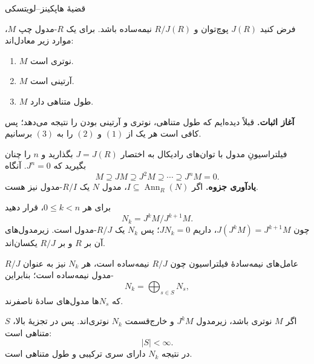 \begin{frame}[t]{قضیهٔ هاپکینز--لویتسکی}
\label{lec15:hopkins-levitzki}
\begin{theorem}
فرض کنید \(J(R)\) پوچ‌توان و \(R/J(R)\) نیمه‌ساده باشد. برای یک \(R\)-مدول چپ \(M\)، موارد زیر معادل‌اند:
\begin{enumerate}
\item \(M\) نوتری است.
\item \(M\) آرتینی است.
\item \(M\) طول متناهی دارد.
\end{enumerate}
\end{theorem}
\textbf{آغاز اثبات.} قبلاً دیده‌ایم که طول متناهی، نوتری و آرتینی بودن را نتیجه می‌دهد؛ پس کافی است هر یک از \((1)\) و \((2)\) را به \((3)\) برسانیم.
\end{frame}

\begin{frame}[t]{فیلتراسیونِ مدول با توان‌های رادیکال}
\label{lec15:radical-filtration}
به اختصار \(J=J(R)\) بگذارید و \(n\) را چنان بگیرید که \(J^n=0\). آنگاه
\[
 M\supseteq JM\supseteq J^2M\supseteq\cdots\supseteq J^nM=0.
\]
\textbf{یادآوری جزوه.} اگر \(I\subseteq\operatorname{Ann}_R(N)\)، مدول \(N\) یک \(R/I\)-مدول نیز هست.
\medskip

برای هر \(0\leq k<n\)، قرار دهید
\[
 N_k=J^kM/J^{k+1}M.
\]
چون \(J(J^kM)=J^{k+1}M\)، داریم \(JN_k=0\)؛ پس \(N_k\) یک \(R/J\)-مدول است.
زیرمدول‌های آن بر \(R\) و بر \(R/J\) یکسان‌اند.
\end{frame}

\begin{frame}[t]{عامل‌های نیمه‌سادهٔ فیلتراسیون}
\label{lec15:filtration-factors}
چون \(R/J\) نیمه‌ساده است، هر \(N_k\) نیز به عنوان \(R/J\)-مدول نیمه‌ساده است؛ بنابراین
\[
 N_k=\bigoplus_{s\in S}N_s,
\]
که \(N_s\)ها مدول‌های سادهٔ ناصفرند.
\medskip

اگر \(M\) نوتری باشد، زیرمدول \(J^kM\) و خارج‌قسمت \(N_k\) نوتری‌اند.
پس در تجزیهٔ بالا، \(S\) متناهی است:
\[
 |S|<\infty.
\]
در نتیجه \(N_k\) دارای سری ترکیبی و طول متناهی است.
\end{frame}

